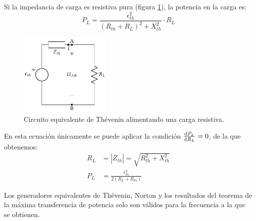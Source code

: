Si la impedancia de carga es resistiva pura (figura \ref{fig:thevenin-resistencia}), la potencia en la carga es:
\begin{equation}
  P_L = \frac{\epsilon^2_{th}}{(R_{th} + R_L)^2 + X_{th}^2} \cdot R_L
\end{equation}

\begin{figure}[H]
  \centering
  \includegraphics[height=4cm]{../figs/EquivalenteThevenin0_RL.pdf}
  \caption{Circuito equivalente de Thévenin alimentando una carga resistiva.}
  \label{fig:thevenin-resistencia}
\end{figure}

En esta ecuación únicamente se puede aplicar la condición $\diff{P_L}{R_L} = 0$, de la que obtenemos:
\begin{align*}
      R_L &= |\overline{Z}_{th}| = \sqrt{R_{th}^2 + X_{th}^2}\\
      P_L &= \frac{\epsilon^2_{th}}{2(R_L + R_{th})}
\end{align*}

\begin{remark}
  Los generadores equivalentes de Thévenin, Norton y los resultados
  del teorema de la máxima transferencia de potencia solo son válidos
  para la frecuencia a la que se obtienen.
\end{remark}

